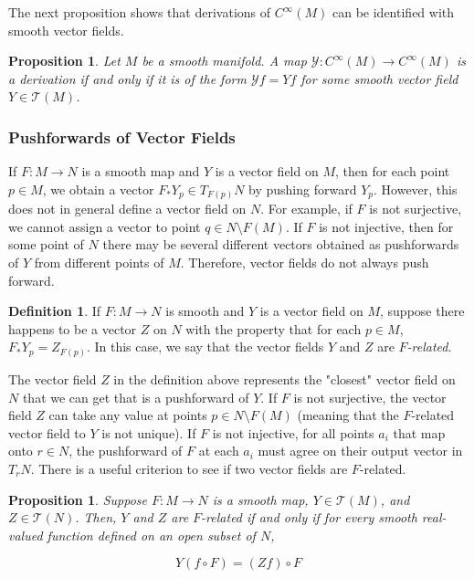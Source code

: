 \documentclass{article}
\newtheorem{proposition}[theorem]{Proposition}
\theoremstyle{remark}
\theoremstyle{definition}
\newtheorem{definition}{Definition}[section]
\begin{document}
    The next proposition shows that derivations of $C^\infty (M)$ can be identified with smooth vector fields. 

    \begin{proposition}
      Let $M$ be a smooth manifold. A map $\mathcal{Y}: C^\infty (M) \longrightarrow C^\infty (M)$ is a derivation if and only if it is of the form $\mathcal{Y} f = Y f$ for some smooth vector field $Y \in \mathcal{T}(M)$. 
    \end{proposition}

    \subsubsection{Pushforwards of Vector Fields}

      If $F: M \longrightarrow N$ is a smooth map and $Y$ is a vector field on $M$, then for each point $p \in M$, we obtain a vector $F_* Y_p \in T_{F(p)} N$ by pushing forward $Y_p$. However, this does not in general define a vector field on $N$. For example, if $F$ is not surjective, we cannot assign a vector to point $q \in N \setminus F(M)$. If $F$ is not injective, then for some point of $N$ there may be several different vectors obtained as pushforwards of $Y$ from different points of $M$. Therefore, vector fields do not always push forward. 

      \begin{definition}
        If $F: M \longrightarrow N$ is smooth and $Y$ is a vector field on $M$, suppose there happens to be a vector $Z$ on $N$ with the property that for each $p \in M$, $F_* Y_p = Z_{F(p)}$. In this case, we say that the vector fields $Y$ and $Z$ are \textit{$F$-related}. 
      \end{definition}

      The vector field $Z$ in the definition above represents the "closest" vector field on $N$ that we can get that is a pushforward of $Y$. If $F$ is not surjective, the vector field $Z$ can take any value at points $p \in N \setminus F(M)$ (meaning that the $F$-related vector field to $Y$ is not unique). If $F$ is not injective, for all points $a_i$ that map onto $r \in N$, the pushforward of $F$ at each $a_i$ must agree on their output vector in $T_r N$. There is a useful criterion to see if two vector fields are $F$-related. 

      \begin{proposition}
        Suppose $F: M \longrightarrow N$ is a smooth map, $Y \in \mathcal{T}(M)$, and $Z \in \mathcal{T}(N)$. Then, $Y$ and $Z$ are $F$-related if and only if for every smooth real-valued function defined on an open subset of $N$, 

          \[Y (f \circ F) = (Z f) \circ F\]
      \end{proposition}
\end{document}

